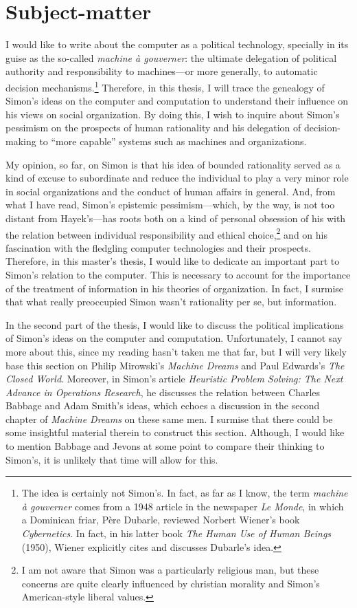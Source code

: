 \documentclass[draft=false, paper=A4,portrait,twoside=true,twocolumn=false,headinclude=false,footinclude=false,fontsize=11,BCOR=15mm,DIV=calc,pagesize=auto,titlepage=firstiscover,mpinclude=true,headings=big,headings=twolinechapter,open=right,chapterprefix=false,headsepline=false,parskip=full]{scrbook}
\begin{document}
\section{Subject-matter}
\label{sec:orga9d2802}
I would like to write about the computer as a political technology,
specially in its guise as the so-called \emph{machine à gouverner}: the ultimate
delegation of political authority and responsibility to machines---or more
generally, to automatic decision mechanisms.\footnote{The idea is certainly not Simon's. In fact, as far as I know, the
term \emph{machine à gouverner} comes from a 1948 article in the newspaper \emph{Le
Monde}, in which a Dominican friar, Père Dubarle, reviewed Norbert Wiener's
book \emph{Cybernetics}. In fact, in his latter book \emph{The Human Use of Human
Beings} (1950), Wiener explicitly cites and discusses Dubarle's idea.} Therefore, in this
thesis, I will trace the genealogy of Simon's ideas on the computer and
computation to understand their influence on his views on social
organization. By doing this, I wish to inquire about Simon's pessimism on
the prospects of human rationality and his delegation of decision-making to
``more capable'' systems such as machines and organizations.

My opinion, so far, on Simon is that his idea of bounded rationality served
as a kind of excuse to subordinate and reduce the individual to play a very
minor role in social organizations and the conduct of human affairs in
general. And, from what I have read, Simon's epistemic pessimism---which,
by the way, is not too distant from Hayek's---has roots both on a kind of
personal obsession of his with the relation between individual
responsibility and ethical choice,\footnote{I am not aware that Simon was a particularly religious man, but these
concerns are quite clearly influenced by christian morality and Simon's
American-style liberal values.} and on his fascination with the
fledgling computer technologies and their prospects. Therefore, in this
master's thesis, I would like to dedicate an important part to Simon's
relation to the computer. This is necessary to account for the importance
of the treatment of information in his theories of organization. In
fact, I surmise that what really preoccupied Simon wasn't 
rationality per se, but information.

In the second part of the thesis, I would like to discuss the political
implications of Simon's ideas on the computer and
computation. Unfortunately, I cannot say more about this, since my reading
hasn't taken me that far, but I will very likely base this section on
Philip Mirowski's \emph{Machine Dreams} and Paul Edwards's \emph{The Closed
World}. Moreover, in Simon's article \emph{Heuristic Problem Solving: The Next
Advance in Operations Research}, he discusses the relation between Charles
Babbage and Adam Smith's ideas, which echoes a discussion in the second
chapter of \emph{Machine Dreams} on these same men. I surmise that there could be
some insightful material therein to construct this section. Although, I
would like to mention Babbage and Jevons at some point to compare their
thinking to Simon's, it is unlikely that time will allow for this.
\end{document}
